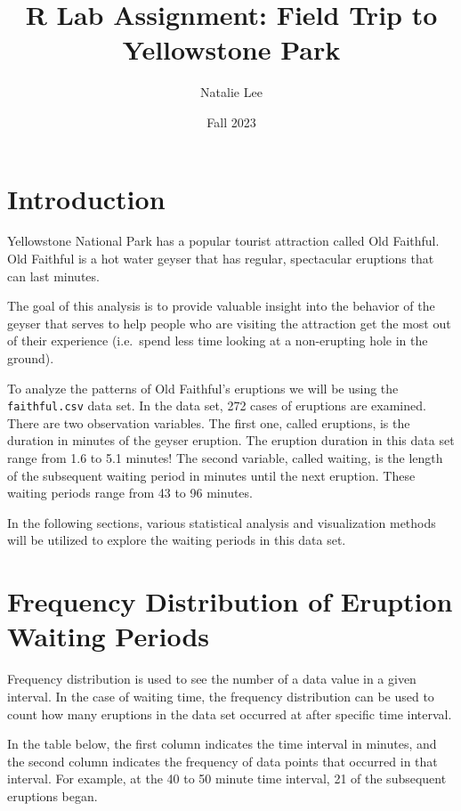 \documentclass[
]{article}
\title{R Lab Assignment: Field Trip to Yellowstone Park}
\author{Natalie Lee}
\date{Fall 2023}
\begin{document}
\maketitle

\hypertarget{introduction}{%
\section{Introduction}\label{introduction}}

Yellowstone National Park has a popular tourist attraction called Old
Faithful. Old Faithful is a hot water geyser that has regular,
spectacular eruptions that can last minutes.

The goal of this analysis is to provide valuable insight into the
behavior of the geyser that serves to help people who are visiting the
attraction get the most out of their experience (i.e.~spend less time
looking at a non-erupting hole in the ground).

To analyze the patterns of Old Faithful's eruptions we will be using the
\texttt{faithful.csv} data set. In the data set, 272 cases of eruptions
are examined. There are two observation variables. The first one, called
eruptions, is the duration in minutes of the geyser eruption. The
eruption duration in this data set range from 1.6 to 5.1 minutes! The
second variable, called waiting, is the length of the subsequent waiting
period in minutes until the next eruption. These waiting periods range
from 43 to 96 minutes.

In the following sections, various statistical analysis and
visualization methods will be utilized to explore the waiting periods in
this data set.

\hypertarget{frequency-distribution-of-eruption-waiting-periods}{%
\section{Frequency Distribution of Eruption Waiting
Periods}\label{frequency-distribution-of-eruption-waiting-periods}}

Frequency distribution is used to see the number of a data value in a
given interval. In the case of waiting time, the frequency distribution
can be used to count how many eruptions in the data set occurred at
after specific time interval.

In the table below, the first column indicates the time interval in
minutes, and the second column indicates the frequency of data points
that occurred in that interval. For example, at the 40 to 50 minute time
interval, 21 of the subsequent eruptions began.
\end{document}
